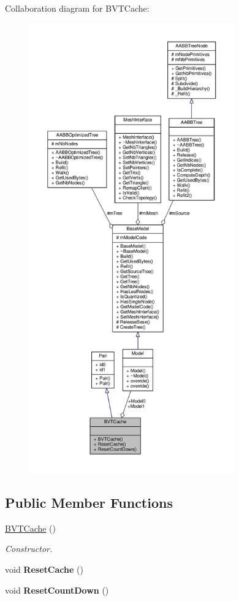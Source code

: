 Collaboration diagram for B\+V\+T\+Cache\+:
\nopagebreak
\begin{figure}[H]
\begin{center}
\leavevmode
\includegraphics[height=550pt]{d2/d40/structBVTCache__coll__graph}
\end{center}
\end{figure}
\subsection*{Public Member Functions}
\begin{DoxyCompactItemize}
\item 
\hyperlink{structBVTCache_a2d02fc5772b2911eab77480fb602ba03}{B\+V\+T\+Cache} ()\hypertarget{structBVTCache_a2d02fc5772b2911eab77480fb602ba03}{}\label{structBVTCache_a2d02fc5772b2911eab77480fb602ba03}

\begin{DoxyCompactList}\small\item\em Constructor. \end{DoxyCompactList}\item 
void {\bfseries Reset\+Cache} ()\hypertarget{structBVTCache_aacca357b3b467e10268de85690bd7469}{}\label{structBVTCache_aacca357b3b467e10268de85690bd7469}

\item 
void {\bfseries Reset\+Count\+Down} ()\hypertarget{structBVTCache_a0ddd027537abc53a06f921d08855ca70}{}\label{structBVTCache_a0ddd027537abc53a06f921d08855ca70}

\end{DoxyCompactItemize}
